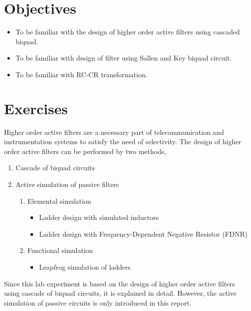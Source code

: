 \documentclass{lab_sheet}
\begin{document}
    \clearpage
    \tableofcontents
    \clearpage
    \listoffigures
    \listoftables
    \clearpage
    \section{Objectives}
    \begin{itemize}
        \item To be familiar with the design of higher order active filters using cascaded biquad.
        \item To be familiar with design of filter using Sallen and Key biquad circuit.
        \item To be familiar with RC-CR transformation.
    \end{itemize}
    \section{Exercises}
    Higher order active filters are a necessary part of telecommunication and instrumentation systems to satisfy the need of selectivity. The design of higher order active filters can be performed by two methods,
    \begin{enumerate}
        \item Cascade of biquad circuits
        \item Active simulation of passive filters
        \begin{enumerate}
            \item Elemental simulation
            \begin{itemize}
                \item Ladder design with simulated inductors
                \item Ladder design with Frequency-Dependent Negative Resistor (FDNR)
            \end{itemize}
            \item Functional simulation
            \begin{itemize}
                \item Leapfrog simulation of ladders
            \end{itemize}
        \end{enumerate}
    \end{enumerate}
    Since this lab experiment is based on the design of higher order active filters using cascade of biquad circuits, it is explained in detail. However, the active simulation of passive circuits is only introduced in this report.
\end{document}
